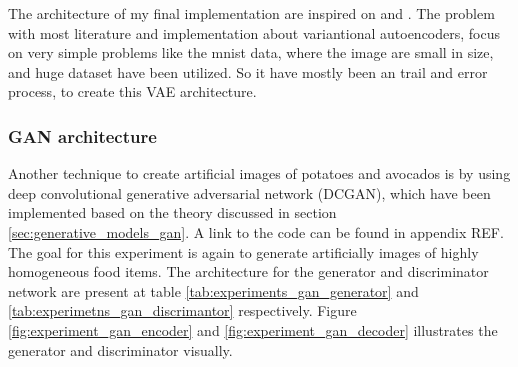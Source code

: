 \documentclass[11pt]{article}
\begin{document}
The architecture of my final implementation are inspired on \cite{vae_experiment_1} and \cite{mastersthesis_vae}. The problem with most literature and implementation about variantional autoencoders, focus on very simple problems like the mnist data, where the image are small in size, and huge dataset have been utilized. So it have mostly been an trail and error process, to create this VAE architecture.

\subsubsection{GAN architecture}

Another technique to create artificial images of potatoes and avocados is by using deep convolutional generative adversarial network (DCGAN), which have been implemented based on the theory discussed in section \ref{sec:generative_models_gan}. A link to the code can be found in appendix REF. The goal for this experiment is again to generate artificially images of highly homogeneous food items. The architecture for the generator and discriminator network are present at table \ref{tab:experiments_gan_generator} and \ref{tab:experimetns_gan_discrimantor} respectively. Figure \ref{fig:experiment_gan_encoder} and \ref{fig:experiment_gan_decoder} illustrates the generator and discriminator visually. 
\end{document}
